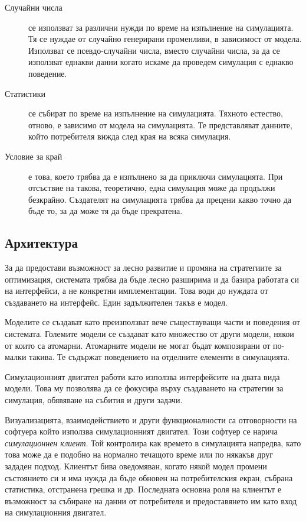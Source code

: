 \begin{description}
				\item[Случайни числа] се използват за различни нужди по време на изпълнение на симулацията.
				Тя се нуждае от случайно генерирани променливи, в зависимост от модела. 
				Използват се псевдо-случайни числа, вместо случайни числа, за да се използват
				еднакви данни когато искаме да проведем симулация с еднакво поведение.				
				
				\item[Статистики] се събират по време на изпълнение на симулацията. Тяхното естество, отново, е зависимо от модела
				на симулацията. Те представляват данните, който потребителя вижда след края на всяка симулация.				
				
				\item[Условие за край] е това, което трябва да е изпълнено за да приключи симулацията. 
				При отсъствие на такова, теоретично, една симулация може да продължи безкрайно.
				Създателят на симулацията трябва да прецени какво точно да бъде то, 
				за да може тя да бъде прекратена.
				
			\end{description}
			
	\subsection{Архитектура}
		\label{sec:architecture}
		
		За да предостави възможност за лесно развитие и промяна на стратегиите за оптимизация, системата
		трябва да бъде лесно разширима и да базира работата си на интерфейси, а не конкретни имплементации.
		Това води до нуждата от създаването на интерфейс. Един задължителен такъв е модел. 
		
		Моделите се създават като преизползват вече съществуващи части и поведения от системата. 
		Големите модели се създават като множество от други модели, някои от които са атомарни.
		Атомарните модели не могат бъдат композирани от по-малки такива. Те съдържат поведението
		на отделните елементи в симулацията.
		
		Симулационният двигател работи като използва интерфейсите на двата вида модели. Това му позволява
		да се фокусира върху създаването на стратегии за симулация, обявяване на събития и други задачи.
		
		Визуализацията, взаимодействието и други функционалности са отговорности на софтуера който използва 
		симулационният двигател. Този софтуер се нарича \emph{симулационнен клиент}. Той контролира
		как времето в симулацията напредва, като това може да е подобно на нормално течащото време или
		по някакъв друг зададен подход. Клиентът бива оведомяван, когато някой модел промени състоянието си
		и има нужда да бъде обновен на потребителския екран, събрана статистика, отстранена грешка и др.
		Последната основна роля на клиентът е възможност за събиране на данни от потребителя и предоставянето
		им като вход на симулационния двигател.
		

